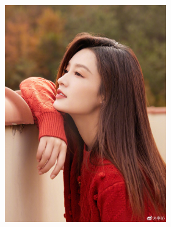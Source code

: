\documentclass[a4paper]{article}
\begin{document}
\begin{figure}[H]
\begin{subfigure}{0.4\linewidth}
		\begin{subfigure}{0.49\linewidth}
			\includegraphics[width=\linewidth]{images/lq3}
			\caption{}
		\end{subfigure}
		\begin{subfigure}{0.49\linewidth}

\end{subfigure}
\end{subfigure}
\end{figure}
\end{document}
